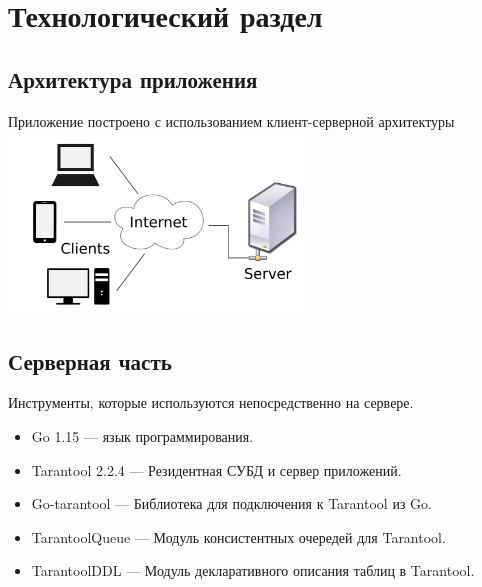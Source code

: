 \section{Технологический раздел}

\subsection{Архитектура приложения}

\begin{frame}
\begin{center}
	Приложение построено с использованием клиент-серверной архитектуры
	\includegraphics[width=0.6\textwidth]{./Client-server-model.png}
\end{center}
\end{frame}

\subsection{Серверная часть}

\begin{frame}
Инструменты, которые используются непосредственно на сервере.

\begin{itemize}
    \item Go 1.15 --- язык программирования. 
    
    \item Tarantool 2.2.4 --- Резидентная СУБД и сервер приложений.
    
    \item Go-tarantool --- Библиотека для подключения к Tarantool из Go.
    
    \item TarantoolQueue --- Модуль консистентных 
    очередей для Tarantool.

    \item TarantoolDDL --- Модуль декларативного описания таблиц в Tarantool. 
\end{itemize}
\end{frame}

